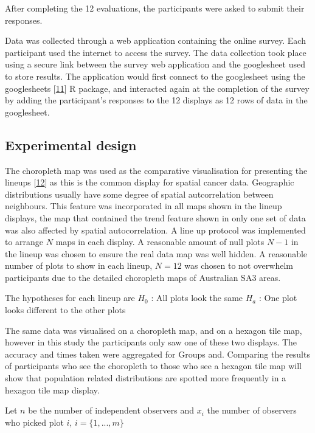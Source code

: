 \documentclass[conference,final,]{IEEEtran}
\begin{document}
After completing the 12 evaluations, the participants were asked to submit their responses.

Data was collected through a web application containing the online survey.
Each participant used the internet to access the survey.
The data collection took place using a secure link between the survey web application and the googlesheet used to store results. The application would first connect to the googlesheet using the googlesheets {[}\protect\hyperlink{ref-sheets}{11}{]} R package, and interacted again at the completion of the survey by adding the participant's responses to the 12 displays as 12 rows of data in the googlesheet.

\hypertarget{experimental-design}{%
\subsection{Experimental design}\label{experimental-design}}

The choropleth map was used as the comparative visualisation for presenting the lineups {[}\protect\hyperlink{ref-VVSIALM}{12}{]} as this is the common display for spatial cancer data.
Geographic distributions usually have some degree of spatial autcorrelation between neighbours.
This feature was incorporated in all maps shown in the lineup displays, the map that contained the trend feature shown in only one set of data was also affected by spatial autocorrelation.
A line up protocol was implemented to arrange \(N\) maps in each display.
A reasonable amount of null plots \(N-1\) in the lineup was chosen to ensure the real data map was well hidden. A reasonable number of plots to show in each lineup, \(N = 12\) was chosen to not overwhelm participants due to the detailed choropleth maps of Australian SA3 areas.

The hypotheses for each lineup are
\(H_0\) : All plots look the same
\(H_a\) : One plot looks different to the other plots

The same data was visualised on a choropleth map, and on a hexagon tile map, however in this study the participants only saw one of these two displays. The accuracy and times taken were aggregated for Groups and.
Comparing the results of participants who see the choropleth to those who see a hexagon tile map will show that population related distributions are spotted more frequently in a hexagon tile map display.

Let \(n\) be the number of independent observers and \(x_i\) the
number of observers who picked plot \(i\), \(i = \{1,...,m\}\)
\end{document}
